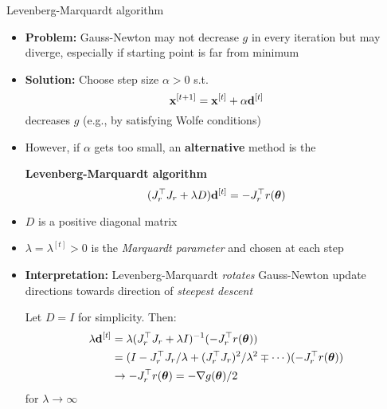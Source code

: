 \documentclass[11pt,compress,t,notes=noshow, xcolor=table]{beamer}
\begin{document}
\begin{vbframe}{Levenberg-Marquardt algorithm}

\begin{itemize}
    \item \textbf{Problem:} Gauss-Newton may not decrease $g$ in every iteration but may diverge, especially if starting point is far from minimum
    \item \textbf{Solution:} Choose step size $\alpha > 0$ s.t.
        \begin{equation*}
            \mathbf{x}^{[t+1]} = \mathbf{x}^{[t]} + \alpha \mathbf{d}^{[t]}
        \end{equation*}
        decreases $g$ (e.g., by satisfying Wolfe conditions)
    \item However, if $\alpha$ gets too small, an \textbf{alternative} method is the
        \begin{framed}
            \centering
            \textbf{Levenberg-Marquardt algorithm}
            \begin{equation*}
                (J_r^\top J_r + \lambda D) \mathbf{d}^{[t]} = -J_r^\top r(\bm{\theta})
            \end{equation*}
        \end{framed}
    \item $D$ is a positive diagonal matrix
    \item $\lambda = \lambda^{[t]} > 0$ is the \emph{Marquardt parameter} and chosen at each step
\end{itemize}

\framebreak

\begin{itemize}
    \item \textbf{Interpretation:} Levenberg-Marquardt \emph{rotates} Gauss-Newton update directions towards direction of \emph{steepest descent}
        \begin{framed}
            Let $D = I$ for simplicity.
            Then:
            \begin{align*}
                \lambda \mathbf{d}^{[t]} &= \lambda (J_r^\top J_r + \lambda I)^{-1} (- J_r^\top r(\bm{\theta})) \\
                &= (I - J_r^\top J_r / \lambda + (J_r^\top J_r)^2 / \lambda^2 \mp \cdots) (- J_r^\top r(\bm{\theta})) \\
                &\to - J_r^\top r(\bm{\theta}) = - \nabla g(\bm{\theta}) / 2
            \end{align*}
            for $\lambda \to \infty$

            \medskip


\end{framed}
\end{itemize}
\end{vbframe}
\end{document}

